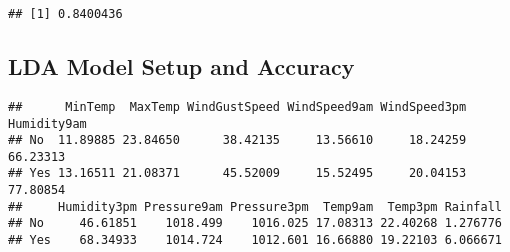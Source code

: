 \documentclass[
]{article}
\newenvironment{Shaded}{\begin{snugshade}}{\end{snugshade}}
\newcommand{\AttributeTok}[1]{\textcolor[rgb]{0.77,0.63,0.00}{#1}}
\newcommand{\FunctionTok}[1]{\textcolor[rgb]{0.00,0.00,0.00}{#1}}
\newcommand{\NormalTok}[1]{#1}
\newcommand{\OtherTok}[1]{\textcolor[rgb]{0.56,0.35,0.01}{#1}}
\newcommand{\SpecialCharTok}[1]{\textcolor[rgb]{0.00,0.00,0.00}{#1}}
\newcommand{\StringTok}[1]{\textcolor[rgb]{0.31,0.60,0.02}{#1}}
\begin{document}
\begin{verbatim}
## [1] 0.8400436
\end{verbatim}

\hypertarget{lda-model-setup-and-accuracy}{%
\subsection{LDA Model Setup and
Accuracy}\label{lda-model-setup-and-accuracy}}

\begin{Shaded}
\end{Shaded}

\begin{verbatim}
##      MinTemp  MaxTemp WindGustSpeed WindSpeed9am WindSpeed3pm Humidity9am
## No  11.89885 23.84650      38.42135     13.56610     18.24259    66.23313
## Yes 13.16511 21.08371      45.52009     15.52495     20.04153    77.80854
##     Humidity3pm Pressure9am Pressure3pm  Temp9am  Temp3pm Rainfall
## No     46.61851    1018.499    1016.025 17.08313 22.40268 1.276776
## Yes    68.34933    1014.724    1012.601 16.66880 19.22103 6.066671
\end{verbatim}

\begin{Shaded}
\end{Shaded}
\end{document}
